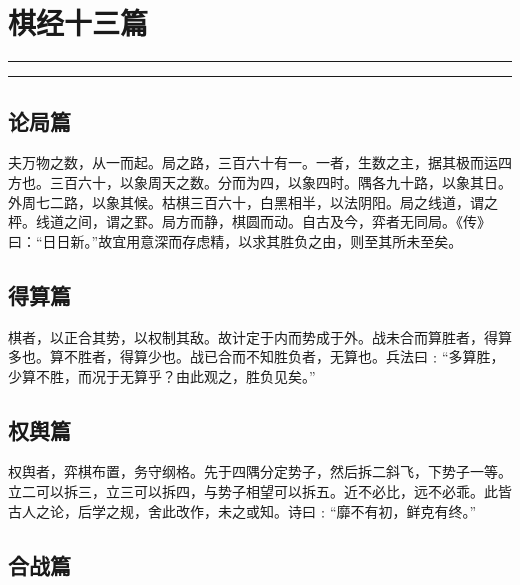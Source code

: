\documentclass[]{article}
\date{}
\begin{document}
\hypertarget{header-n0}{%
\section{棋经十三篇}\label{header-n0}}

\begin{center}\rule{0.5\linewidth}{\linethickness}\end{center}

\tableofcontents

\begin{center}\rule{0.5\linewidth}{\linethickness}\end{center}

\hypertarget{header-n10}{%
\subsection{论局篇}\label{header-n10}}

夫万物之数，从一而起。局之路，三百六十有一。一者，生数之主，据其极而运四方也。三百六十，以象周天之数。分而为四，以象四时。隅各九十路，以象其日。外周七二路，以象其候。枯棋三百六十，白黑相半，以法阴阳。局之线道，谓之枰。线道之间，谓之罫。局方而静，棋圆而动。自古及今，弈者无同局。《传》曰：``日日新。''故宜用意深而存虑精，以求其胜负之由，则至其所未至矣。

\hypertarget{header-n151}{%
\subsection{得算篇}\label{header-n151}}

棋者，以正合其势，以权制其敌。故计定于内而势成于外。战未合而算胜者，得算多也。算不胜者，得算少也。战已合而不知胜负者，无算也。兵法曰﹕``多算胜，少算不胜，而况于无算乎？由此观之，胜负见矣。''

\hypertarget{header-n155}{%
\subsection{权舆篇}\label{header-n155}}

权舆者，弈棋布置，务守纲格。先于四隅分定势子，然后拆二斜飞，下势子一等。立二可以拆三，立三可以拆四，与势子相望可以拆五。近不必比，远不必乖。此皆古人之论，后学之规，舍此改作，未之或知。诗曰﹕``靡不有初，鲜克有终。''

\hypertarget{header-n159}{%
\subsection{合战篇}\label{header-n159}}
\end{document}
